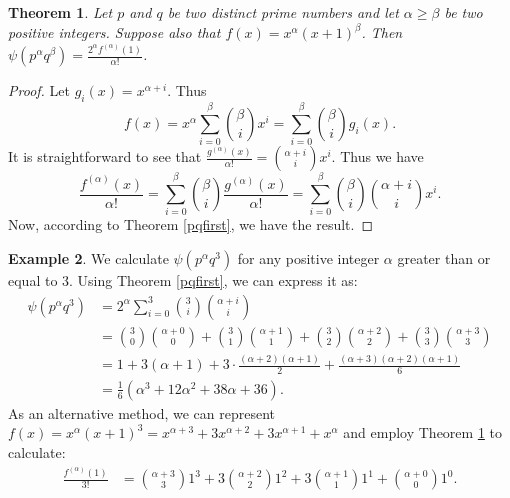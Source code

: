 \documentclass{amsart}
\newtheorem{theorem}{Theorem}[section]
\theoremstyle{definition}
\newtheorem{example}[theorem]{Example}
\begin{document}
\begin{theorem}\label{pqsecond}
Let $p$ and $q$ be two distinct prime numbers and let $\alpha\geqslant \beta$ be two positive integers. Suppose also that $f(x)=x^\alpha(x+1)^\beta$. Then $\psi(p^\alpha q^\beta)=\frac{2^\alpha f^{(\alpha)}(1)}{\alpha!}$.
\end{theorem}

\begin{proof}
Let $g_i(x)=x^{\alpha+i}$. Thus
\[f(x)=x^\alpha\sum_{i=0}^\beta\binom{\beta}{i} x^i =\sum_{i=0}^\beta \binom{\beta}{i}g_i(x).\]
It is straightforward to see that $\frac{g^{(\alpha)}(x)}{\alpha!}=\binom{\alpha+i}{i}x^i$. Thus we have
\[
\frac{f^{(\alpha)}(x)}{\alpha!}=\sum_{i=0}^\beta \binom{\beta}{i}\frac{g^{(\alpha)}(x)}{\alpha!}
=\sum_{i=0}^\beta \binom{\beta}{i}\binom{\alpha+i}{i}x^i.
\]
Now, according to Theorem \ref{pqfirst}, we have the result. 
\end{proof}

\begin{example}
We calculate $\psi(p^\alpha q^3)$ for any positive integer $\alpha$ greater than or equal to 3. Using Theorem \ref{pqfirst}, we can express it as:
\begin{align*}
\psi(p^\alpha q^3)&=2^\alpha\sum_{i=0}^3\binom{3}{i} \binom{\alpha+i}{i}\\
&=\binom{3}{0}\binom{\alpha+0}{0}
+\binom{3}{1}\binom{\alpha+1}{1}
+\binom{3}{2}\binom{\alpha+2}{2}
+\binom{3}{3}\binom{\alpha+3}{3}\\
&= 1+3(\alpha+1)+3\cdot \frac{(\alpha+2)(\alpha+1)}{2}+\frac{(\alpha+3)(\alpha+2)(\alpha+1)}{6}\\
&=\frac{1}{6}(\alpha^3+12\alpha^2+38\alpha+36).
\end{align*}
As an alternative method, we can represent $f(x)=x^\alpha(x+1)^3=x^{\alpha+3}+3x^{\alpha+2} +3x^{\alpha+1}+x^\alpha$ and employ Theorem \ref{pqsecond} to calculate:
\begin{align*}
\frac{f^{(\alpha)}(1)}{3!}&=\binom{\alpha+3}{3}1^3+3\binom{\alpha+2}{2}1^2 +3\binom{\alpha+1}{1}1^1+\binom{\alpha+0}{0}1^0.
\end{align*}

\end{example}


\end{document}
